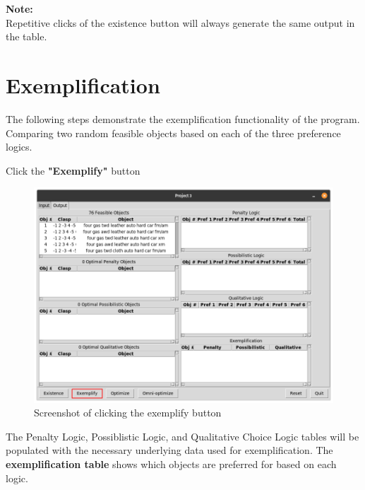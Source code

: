 \documentclass[12pt]{report}
\begin{document}
\textbf{Note:} \\
Repetitive clicks of the existence button will always generate the same output in the table.

\section{Exemplification}
\vspace{.75em}
The following steps demonstrate the exemplification functionality of the program. \\
Comparing two random feasible objects based on each of the three preference logics.\\

\begin{description}[leftmargin=4em]
\item [Step 1:] Click the \textbf{"Exemplify"} button
\begin{figure}[H]
\begin{center}
\includegraphics[scale=0.3,trim=1cm 1cm 1cm 1cm]{exemplify}
\caption{Screenshot of clicking the exemplify button}
\end{center}
\end{figure}
\vspace{-2.5em}
\item [Result:] The Penalty Logic, Possiblistic Logic, and Qualitative Choice Logic tables will be populated with the necessary underlying data used for exemplification. The \textbf{exemplification table} shows which objects are preferred for based on each logic.
\begin{figure}[H]
\begin{center}

\end{center}
\end{figure}
\end{description}
\end{document}
